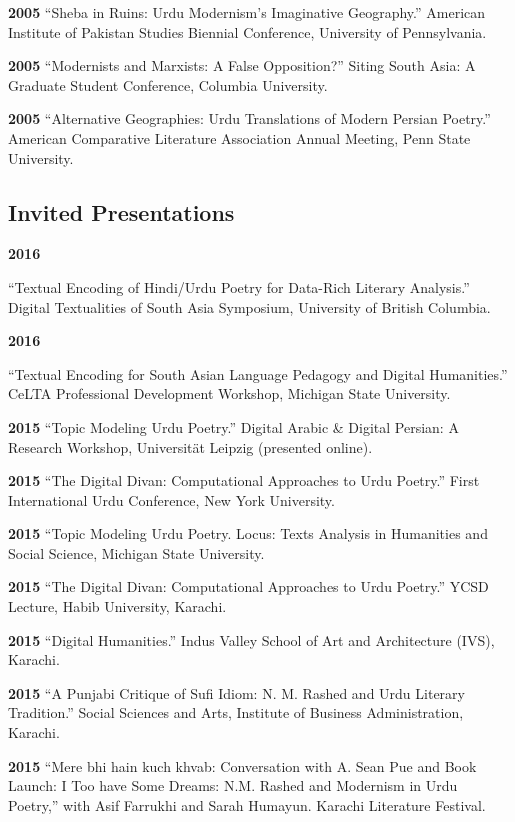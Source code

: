 \documentclass[letterpaper,12pt]{article}
\begin{document}
\textbf{2005}
“Sheba in Ruins: Urdu Modernism’s Imaginative Geography.”
American Institute of Pakistan Studies Biennial Conference, University of Pennsylvania.

\textbf{2005}
“Modernists and Marxists: A False Opposition?”
Siting South Asia: A Graduate Student Conference, Columbia University.

\textbf{2005}
“Alternative Geographies: Urdu Translations of Modern Persian Poetry.”
American Comparative Literature Association Annual Meeting, Penn State University.


\subsection{Invited Presentations%
  \label{invited-presentations}%
}

\textbf{2016}

“Textual Encoding of Hindi/Urdu Poetry for Data-Rich Literary Analysis.” Digital Textualities of South Asia Symposium, University of British Columbia.

\textbf{2016}

“Textual Encoding for South Asian Language Pedagogy and Digital Humanities.” CeLTA Professional Development Workshop, Michigan State University.

\textbf{2015}
“Topic Modeling Urdu Poetry.” Digital Arabic \& Digital Persian: A Research Workshop, Universität Leipzig (presented online).

\textbf{2015}
“The Digital Divan: Computational Approaches to Urdu Poetry.” First International Urdu Conference, New York University.

\textbf{2015}
“Topic Modeling Urdu Poetry.\textquotedbl{} Locus: Texts Analysis in Humanities and Social Science, Michigan State University.

\textbf{2015}
“The Digital Divan: Computational Approaches to Urdu Poetry.”
YCSD Lecture, Habib University, Karachi.

\textbf{2015}
“Digital Humanities.”
Indus Valley School of Art and Architecture (IVS), Karachi.

\textbf{2015}
“A Punjabi Critique of Sufi Idiom: N. M. Rashed and Urdu Literary Tradition.”
Social Sciences and Arts, Institute of Business Administration, Karachi.

\textbf{2015}
“Mere bhi hain kuch khvab: Conversation with A. Sean Pue and Book Launch: I Too have Some Dreams: N.M. Rashed and Modernism in Urdu Poetry,” with Asif Farrukhi and Sarah Humayun.
Karachi Literature Festival.
\end{document}
